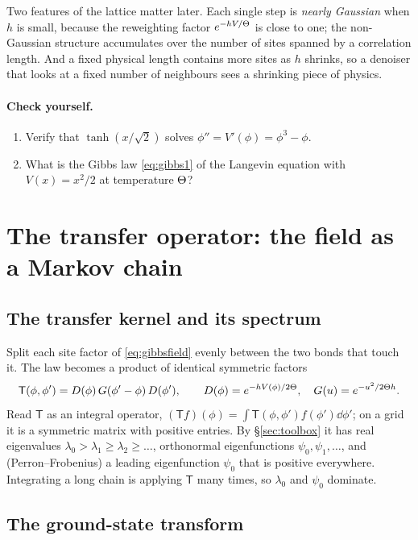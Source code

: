 Two features of the lattice matter later. Each single step is \emph{nearly Gaussian} when $h$ is small, because
the reweighting factor $e^{-hV/\Theta}$ is close to one; the non-Gaussian structure accumulates over the number of
sites spanned by a correlation length. And a fixed physical length contains more sites as $h$ shrinks, so a
denoiser that looks at a fixed number of neighbours sees a shrinking piece of physics.

\paragraph{Check yourself.}
\begin{enumerate}[label=\thesection.\arabic*,leftmargin=2.2em]
\item Verify that $\tanh(x/\sqrt2)$ solves $\phi''=V'(\phi)=\phi^3-\phi$.
\item What is the Gibbs law \eqref{eq:gibbs1} of the Langevin equation with $V(x)=x^2/2$ at temperature $\Theta$?
\end{enumerate}

\section{The transfer operator: the field as a Markov chain}\label{sec:transfer}

\subsection{The transfer kernel and its spectrum}

Split each site factor of \eqref{eq:gibbsfield} evenly between the two bonds that touch it. The law becomes a
product of identical symmetric factors
\begin{equation}\label{eq:transfer}
  \mathsf T(\phi,\phi')=D(\phi)\,G(\phi'-\phi)\,D(\phi'),\qquad D(\phi)=e^{-hV(\phi)/2\Theta},\quad G(u)=e^{-u^2/2\Theta h}.
\end{equation}
Read $\mathsf T$ as an integral operator, $(\mathsf Tf)(\phi)=\int\mathsf T(\phi,\phi')f(\phi')\dd\phi'$; on a grid it is a symmetric matrix with
positive entries. By \S\ref{sec:toolbox} it has real eigenvalues $\lambda_0>\lambda_1\ge\lambda_2\ge\dots$, orthonormal
eigenfunctions $\psi_0,\psi_1,\dots$, and (Perron--Frobenius) a leading eigenfunction $\psi_0$ that is positive
everywhere. Integrating a long chain is applying $\mathsf T$ many times, so $\lambda_0$ and $\psi_0$ dominate.

\subsection{The ground-state transform}

